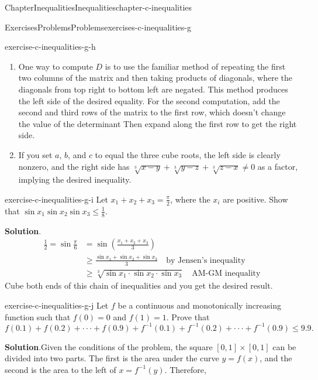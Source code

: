 \documentclass[oneside,10pt,]{book}
\newcommand{\blocktitlefont}{\relax}
\numberwithin{equation}{section}
\begin{document}
\begin{chapterptx}{Chapter}{Inequalities}{}{Inequalities}{}{}{chapter-c-inequalities}
\begin{exercises-section}{Exercises}{Problems}{}{Problems}{}{}{exercises-c-inequalities-g}
\begin{divisionexercise}{7}{}{}{exercise-c-inequalities-g-h}
\begin{enumerate}[label=(\alph*)]
\item{}One way to compute \(D\) is to use the familiar method of repeating the first two columns of the matrix and then taking products of diagonals, where the diagonals from top right to bottom left are negated.  This method produces the left side of the desired equality.  For the second computation, add the second and third rows of the matrix to the first row, which doesn't change the value of the determinant  Then expand along the first row to get the right side.%
\item{}If you set \(a\), \(b\), and \(c\) to equal the three cube roots, the left side is clearly nonzero, and the right side has \(\sqrt[3]{x-y}+ \sqrt[3]{y-z}+\sqrt[3]{z-x}\neq 0\) as a factor, implying the desired inequality.%
\end{enumerate}
%
\end{divisionexercise}%
\begin{divisionexercise}{8}{}{}{exercise-c-inequalities-g-i}%
Let \(x_1+x_2+x_3=\frac{\pi }{2}\), where the \(x_i\) are positive.   Show that  \(\sin  x_1\sin  x_2 \sin  x_3\leq \frac{1}{8}\).%
\par\smallskip%
\noindent\textbf{\blocktitlefont Solution}.\hypertarget{solution-c-inequalities-g-i-b}{}\quad{}%
\begin{equation*}
\begin{split}
\frac{1}{2} = \sin{\frac{\pi}{6}} &=\sin{\left( \frac{x_1+x_2+x_3}{3}\right)}\\
& \geq \frac{\sin{x_1}+\sin{x_2}+\sin{x_3}}{3} \quad \textrm{by Jensen's inequality}\\
& \geq \sqrt[3]{\sin{x_1}\cdot \sin{x_2}\cdot \sin{x_3}} \quad \textrm{AM-GM inequality}
\end{split}
\end{equation*}
Cube both ends of this chain of inequalities and you get the desired result.%
\end{divisionexercise}%
\begin{divisionexercise}{9}{}{}{exercise-c-inequalities-g-j}%
Let \(f\) be a continuous and monotonically increasing function such that \(f(0) = 0\) and \(f(1) = 1\). Prove that%
\begin{equation*}
f(0.1)+f(0.2)+\cdot  \cdot  \cdot +f(0.9)+f^{-1}(0.1)+f^{-1}(0.2)+\cdot  \cdot  \cdot +f^{-1}(0.9) \leq  9.9\text{.}
\end{equation*}
%
\par\smallskip%
\noindent\textbf{\blocktitlefont Solution}.\hypertarget{solution-c-inequalities-g-j-b}{}\quad{}Given the conditions of the problem, the square \([0,1]\times [0,1]\) can be divided into two parts. The first is the area under the curve \(y=f(x)\), and the second is the area to the left of \(x=f^{-1}(y)\). Therefore,%

\end{divisionexercise}
\end{exercises-section}
\end{chapterptx}
\end{document}
